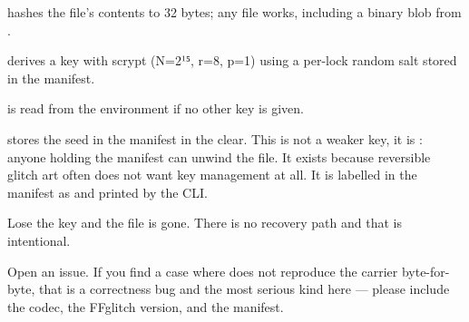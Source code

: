 \documentclass[fontpath=fonts/,logopath=logo/]{riposte-doc}
\begin{document}

\begin{ripbullets}
\item {} hashes the file's contents to 32 bytes; any file works, including a binary blob from .
\item {} derives a key with scrypt (N=2¹⁵, r=8, p=1) using a per-lock random salt stored in the manifest.
\item {} is read from the environment if no other key is given.
\item {} stores the seed in the manifest in the clear. This is not a weaker key, it is : anyone holding the manifest can unwind the file. It exists because reversible glitch art often does not want key management at all. It is labelled in the manifest as  and printed by the CLI.
\end{ripbullets}

Lose the key and the file is gone. There is no recovery path and that is intentional.



Open an issue. If you find a case where  does not reproduce the carrier byte-for-byte, that is a correctness bug and the most serious kind here — please include the codec, the FFglitch version, and the manifest.

\ripend
\end{document}
